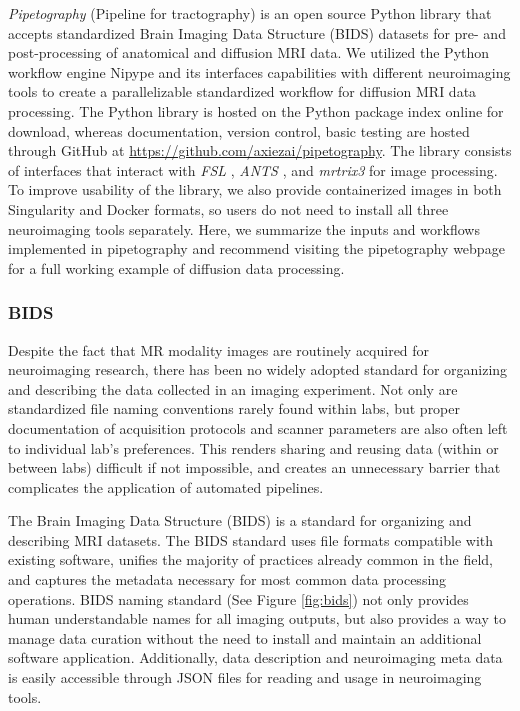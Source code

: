 \emph{Pipetography} (Pipeline for tractography) is an open source Python library that accepts standardized Brain Imaging Data Structure (BIDS) datasets \cite{gorgolewski_brain_2016} for pre- and post-processing of anatomical and diffusion MRI data. We utilized the Python workflow engine Nipype \cite{gorgolewski_nipype_2011} and its interfaces capabilities with different neuroimaging tools to create a parallelizable standardized workflow for diffusion MRI data processing. The Python library is hosted on the Python package index online for download, whereas documentation, version control, basic testing are hosted through GitHub at \url{https://github.com/axiezai/pipetography}. The library consists of interfaces that interact with \emph{FSL} \cite{Jenkinson2012}, \emph{ANTS} \cite{avants2009advanced}, and \emph{mrtrix3} \cite{tournier_mrtrix3_2019} for image processing. To improve usability of the library, we also provide containerized images in both Singularity and Docker formats, so users do not need to install all three neuroimaging tools separately. Here, we summarize the inputs and workflows implemented in pipetography and recommend visiting the pipetography webpage for a full working example of diffusion data processing. 

\subsubsection{BIDS}
Despite the fact that MR modality images are routinely acquired for neuroimaging research, there has been no widely adopted standard for organizing and describing the data collected in an imaging experiment. Not only are standardized file naming conventions rarely found within labs, but proper documentation of acquisition protocols and scanner parameters are also often left to individual lab's preferences. This renders sharing and reusing data (within or between labs) difficult if not impossible, and creates an unnecessary barrier that complicates the application of automated pipelines. 

The Brain Imaging Data Structure (BIDS) is a standard for organizing and describing MRI datasets. The BIDS standard uses file formats compatible with existing software, unifies the majority of practices already common in the field, and captures the metadata necessary for most common data processing operations. BIDS naming standard (See Figure \ref{fig:bids}) not only provides human understandable names for all imaging outputs, but also provides a way to manage data curation without the need to install and maintain an additional software application. Additionally, data description and neuroimaging meta data is easily accessible through JSON files for reading and usage in neuroimaging tools. 

